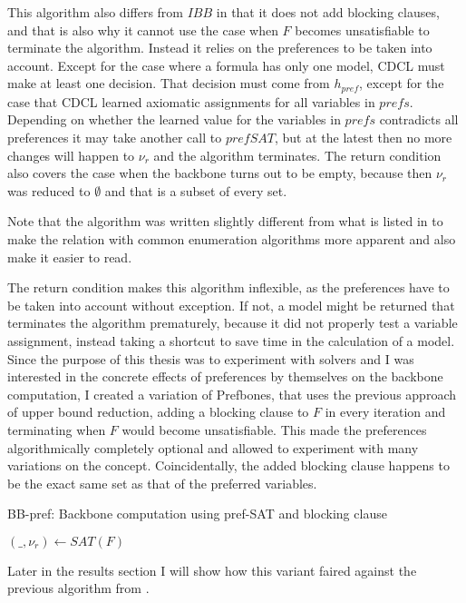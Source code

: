 This algorithm also differs from $IBB$ in that it does not add blocking clauses, and that is also why it cannot use the case when $F$ becomes unsatisfiable to terminate the algorithm. Instead it relies on the preferences to be taken into account. Except for the case where a formula has only one model, CDCL must make at least one decision. That decision must come from $h_{pref}$, except for the case that CDCL learned axiomatic assignments for all variables in $prefs$. Depending on whether the learned value for the variables in $prefs$ contradicts all preferences it may take another call to $prefSAT$, but at the latest then no more changes will happen to $\nu_r$ and the algorithm terminates. The return condition also covers the case when the backbone turns out to be empty, because then $\nu_r$ was reduced to $\emptyset$ and that is a subset of every set.

Note that the algorithm was written slightly different from what is listed in \cite{PJ18} to make the relation with common enumeration algorithms more apparent and also make it easier to read.

The return condition makes this algorithm inflexible, as the preferences have to be taken into account without exception. If not, a model might be returned that terminates the algorithm prematurely, because it did not properly test a variable assignment, instead taking a shortcut to save time in the calculation of a model. Since the purpose of this thesis was to experiment with solvers and I was interested in the concrete effects of preferences by themselves on the backbone computation, I created a variation of Prefbones, that uses the previous approach of upper bound reduction, adding a blocking clause to $F$ in every iteration and terminating when $F$ would become unsatisfiable. This made the preferences algorithmically completely optional and allowed to experiment with many variations on the concept. Coincidentally, the added blocking clause happens to be the exact same set as that of the preferred variables.

\begin{algorithm}
\caption{{\sc BB-pref: Backbone computation using pref-SAT and blocking clause}}
\label{alg:blockPref}
\DontPrintSemicolon
{}

$(\_,\nu_r) \gets SAT(F)$\;

\end{algorithm}

Later in the results section I will show how this variant faired against the previous algorithm from \cite{PJ18}.

